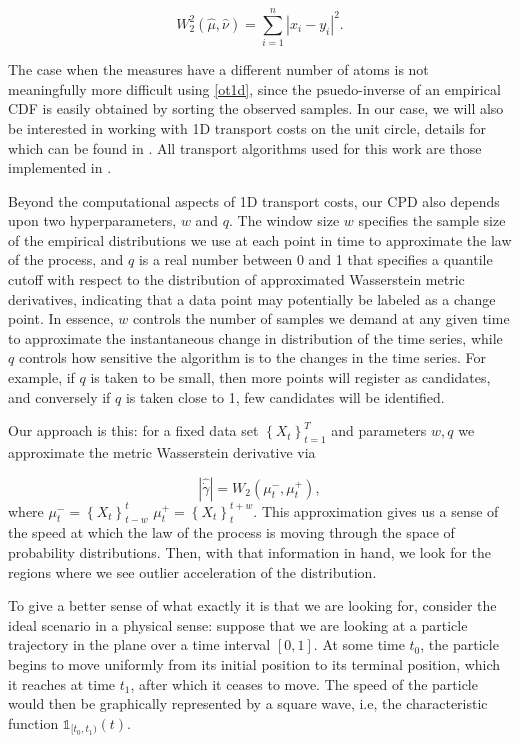 \documentclass{article}
\begin{document}
\begin{equation*}
    W_2^2(\hat\mu,\hat\nu) = \sum\limits_{i=1}^n |x_i - y_i|^2.
\end{equation*}

The case when the measures have a different number of atoms is not meaningfully more difficult using \eqref{ot1d}, since the psuedo-inverse of an empirical CDF is easily obtained by sorting the observed samples. In our case, we will also be interested in working with 1D transport costs on the unit circle, details for which can be found in \cite{delonFastTransportOptimization2010}. All transport algorithms used for this work are those implemented in \cite{flamaryPOTPythonOptimal2021}.

Beyond the computational aspects of 1D transport costs, our CPD also depends upon two hyperparameters, \(w\) and \(q\). The window size \(w\) specifies the sample size of the empirical distributions we use at each point in time to approximate the law of the process, and \(q\) is a real number between 0 and 1 that specifies a quantile cutoff with respect to the distribution of approximated Wasserstein metric derivatives, indicating that a data point may potentially be labeled as a change point.  In essence, \(w\) controls the number of samples we demand at any given time to approximate the instantaneous change in distribution of the time series, while \(q\) controls how sensitive the algorithm is to the changes in the time series. For example, if \(q\) is taken to be small, then more points will register as candidates, and conversely if \(q\) is taken close to 1, few candidates will be identified.

Our approach is this: for a fixed data set \(\left\{X_t\right\}_{t=1}^T\) and parameters \(w, q\) we approximate the metric Wasserstein derivative via

\begin{equation*}
    \left|\hat{\dot{\gamma}}\right| = W_2(\mu_t^-, \mu_t^+),
\end{equation*}
where \(\mu_t^- = \left\{X_t\right\}_{t-w}^t\) \(\mu_t^+ = \left\{X_t\right\}_{t}^{t+w}\). This approximation gives us a sense of the speed at which the law of the process is moving through the space of probability distributions. Then, with that information in hand, we look for the regions where we see outlier acceleration of the distribution. 

To give a better sense of what exactly it is that we are looking for, consider the ideal scenario in a physical sense: suppose that we are looking at a particle trajectory in the plane over a time interval \([0,1]\). At some time \(t_0\), the particle begins to move uniformly from its initial position to its terminal position, which it reaches at time \(t_1\), after which it ceases to move. The speed of the particle would then be graphically represented by a square wave, i.e, the characteristic function \(\mathbb{1}_{[t_0,t_1)}(t)\). 
\end{document}
